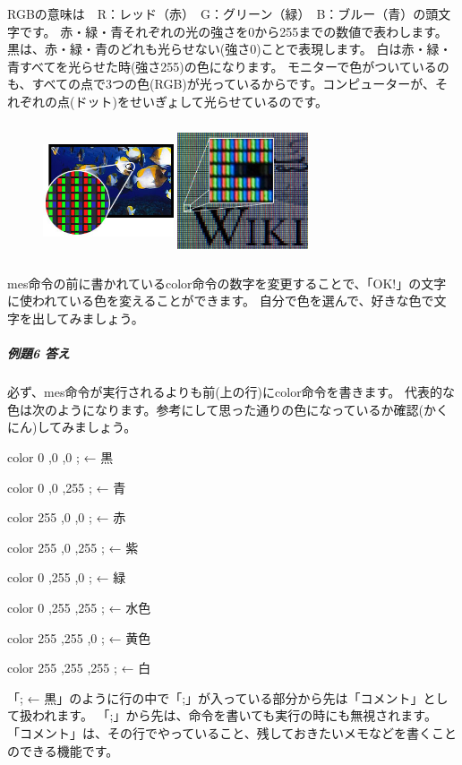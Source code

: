RGBの意味は　R：レッド（赤）　G：グリーン（緑）　B：ブルー（青）の頭文字です。
赤・緑・青それぞれの光の強さを0から255までの数値で表わします。
黒は、赤・緑・青のどれも光らせない(強さ0)ことで表現します。
白は赤・緑・青すべてを光らせた時(強さ255)の色になります。
\clearpage
モニターで色がついているのも、すべての点で3つの色(RGB)が光っているからです。コンピューターが、それぞれの点(ドット)をせいぎょして光らせているのです。

\begin{figure}[H]
    \begin{center}
        \includegraphics[keepaspectratio,width=3.854cm,height=3.988cm]{text02-img/text02-img034.jpg}
        \includegraphics[keepaspectratio,width=3.854cm,height=3.988cm]{text02-img/text02-img035.jpg}
    \end{center}
\end{figure}

mes命令の前に書かれているcolor命令の数字を変更することで、「OK!」の文字に使われている色を変えることができます。
自分で色を選んで、好きな色で文字を出してみましょう。

\subparagraph*{例題6 答え}

必ず、mes命令が実行されるよりも前(上の行)にcolor命令を書きます。
代表的な色は次のようになります。参考にして思った通りの色になっているか確認(かくにん)してみましょう。

\begin{description}
    \item color 0 ,0 ,0 ; ← 黒 
    \item color 0 ,0 ,255 ; ← 青 
    \item color 255 ,0 ,0 ; ← 赤 
    \item color 255 ,0 ,255 ; ← 紫 
    \item color 0 ,255 ,0 ; ← 緑
    \item color 0 ,255 ,255 ; ← 水色
    \item color 255 ,255 ,0 ; ← 黄色
    \item color 255 ,255 ,255 ; ← 白
\end{description}

「; ← 黒」のように行の中で「;」が入っている部分から先は「コメント」として扱われます。
「;」から先は、命令を書いても実行の時にも無視されます。
「コメント」は、その行でやっていること、残しておきたいメモなどを書くことのできる機能です。

